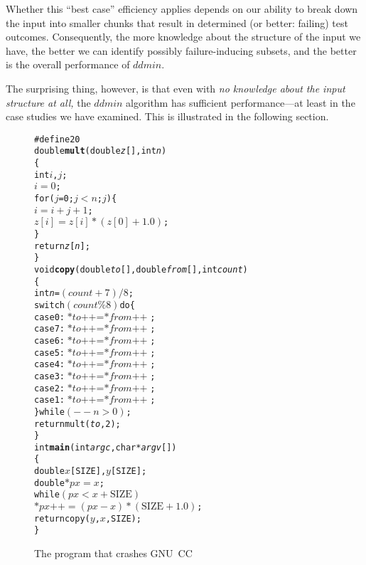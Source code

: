 \documentclass{acm_proc_article-sp}
\newcommand{\GNUCC}      {{\small GNU~CC}\xspace}
\newcommand{\ddmin}{\textit{ddmin}\xspace}
\newcommand{\codeid}[1]{\text{\upshape\texttt{#1}}}
\def\<#1>{\codeid{#1}}
\theoremstyle{plain}
\begin{document}

\noindent
Whether this ``best case'' efficiency applies depends on our ability
to break down the input into smaller chunks that result in determined
(or better: failing) test outcomes.  Consequently, the more knowledge
about the structure of the input we have, the better we can
identify possibly failure-inducing subsets, and the better is the
overall performance of $\ddmin$.

The surprising thing, however, is that even with \emph{no knowledge
  about the input structure at all,} the $\ddmin$ algorithm has
sufficient per\-for\-mance---at least in the case studies we have
examined.  This is illustrated in the following section.

\begin{figure}[!t]
\begin{boxedminipage}{\columnwidth}
\begin{alltt}\rmfamily
\#define  20\medskip
double \textbf{mult}(double \textit{z}[], int \textit{n})
\{
   int \(i\), \(j\);\medskip
   \(i = 0\);
   for (\(j\) = 0; \(j < \textit{n}\); \(j\)\text{++}) \{
      \(i = i + j + 1\);
      \(\textit{z}[i] = \textit{z}[i] * (\textit{z}[0] + 1.0)\);
   \}\smallskip
   return \textit{z}[\textit{n}];
\}\medskip
void \textbf{copy}(double \textit{to}[], double \textit{from}[], int \textit{count})
\{
    int \textit{n} = \((\textit{count} + 7) / 8\);
    switch \((\textit{count} \% 8)\) do \{
        case 0: \(\text{*}\textit{to}\text{++} = \text{*}\textit{from}\text{++}\);
        case 7: \(\text{*}\textit{to}\text{++} = \text{*}\textit{from}\text{++}\);
        case 6: \(\text{*}\textit{to}\text{++} = \text{*}\textit{from}\text{++}\);
        case 5: \(\text{*}\textit{to}\text{++} = \text{*}\textit{from}\text{++}\);
        case 4: \(\text{*}\textit{to}\text{++} = \text{*}\textit{from}\text{++}\);
        case 3: \(\text{*}\textit{to}\text{++} = \text{*}\textit{from}\text{++}\);
        case 2: \(\text{*}\textit{to}\text{++} = \text{*}\textit{from}\text{++}\);
        case 1: \(\text{*}\textit{to}\text{++} = \text{*}\textit{from}\text{++}\);
    \} while \((--\textit{n} > 0)\);\smallskip
    return mult(\textit{to}, 2);
\}\medskip
int \textbf{main}(int \textit{argc}, char *\textit{argv}[])
\{
    double \(x\)[SIZE], \(y\)[SIZE];
    double \(\text{*}\textit{px} = x\);\medskip
    while \((\textit{px} < x + \text{SIZE})\)
        \(\text{*}\textit{px}\text{++} = (\textit{px} - x) * (\text{SIZE} + 1.0)\);\smallskip
    return copy(\(y\), \(x\), SIZE);
\}\end{alltt}
\vspace{-0.25cm}
\end{boxedminipage}
\caption{The \<bug.c> program that crashes \GNUCC}
\label{fig:bug.c}
\end{figure}
\end{document}
